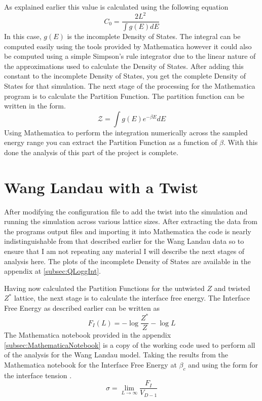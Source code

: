 As explained earlier this value is calculated using the following equation
\begin{equation}
C_0 = \frac{2L^2}{\int g(E) dE}
\end{equation}
In this case, $g(E)$ is the incomplete Density of States. 
The integral can be computed easily using the tools provided by Mathematica however it could also be computed using a simple Simpson's rule integrator due to the linear nature of the approximations used to calculate the Density of States.
After adding this constant to the incomplete Density of States, you get the complete Density of States for that simulation.
The next stage of the processing for the Mathematica program is to calculate the Partition Function.
The partition function can be written in the form.
\begin{equation}
\mathcal{Z} = \int g(E) e^{-\beta E} dE
\end{equation}
Using Mathematica to perform the integration numerically across the sampled energy range you can extract the Partition Function as a function of $\beta$.
With this done the analysis of this part of the project is complete.
\section{Wang Landau with a Twist}
After modifying the configuration file to add the twist into the simulation and running the simulation across various lattice sizes.
After extracting the data from the programs output files and importing it into Mathematica the code is nearly indistinguishable from that described earlier for the Wang Landau data so to ensure that I am not repeating any material I will describe the next stages of analysis here. The plots of the incomplete Density of States are available in the appendix at \ref{subsec:QLoggInt}.

Having now calculated the Partition Functions for the untwisted $Z$ and twisted $Z^*$ lattice, the next stage is to calculate the interface free energy. The Interface Free Energy as described earlier can be written as 
\begin{equation}
F_{I}\left(L\right)=-\log{\frac{Z^*}{Z}} - \log{L}
\end{equation}
The Mathematica notebook provided in the appendix \ref{subsec:MathematicaNotebook} is a copy of the working code used to perform all of the analysis for the Wang Landau model.
Taking the results from the Mathematica notebook for the Interface Free Energy at $\beta_c$ and using the form for the interface tension \cite{1111.4832}.
\begin{equation}
\sigma = \lim_{L\to\infty} \frac{F_{I}}{V_{D-1}}
\end{equation}

